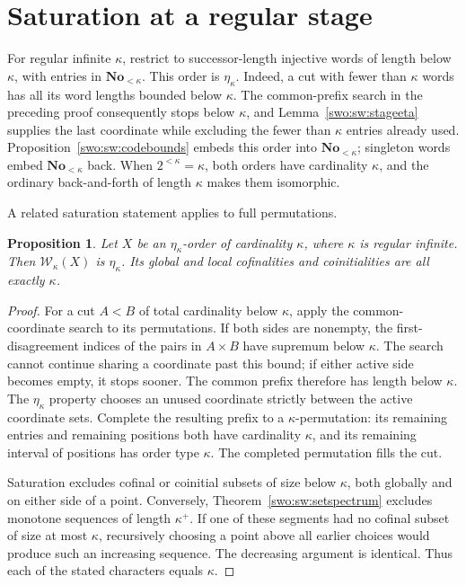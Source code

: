 \documentclass[11pt]{article}
\newtheorem{proposition}[proposition]{Proposition}
\theoremstyle{definition}
\theoremstyle{remark}
\newcommand{\No}{\mathbf{No}}
\newcommand{\WO}{\mathcal W}
\begin{document}
\section{Saturation at a regular stage}\label{swo:sw:stagesaturation}

For regular infinite \(\kappa\), restrict to successor-length
injective words of length below \(\kappa\), with entries in
\(\No_{<\kappa}\).
This order is \(\eta_\kappa\).
Indeed, a cut with fewer than \(\kappa\) words has all its
word lengths bounded below \(\kappa\).
The common-prefix search in the preceding proof consequently
stops below \(\kappa\), and Lemma~\ref{swo:sw:stageeta} supplies
the last coordinate while excluding the fewer than \(\kappa\)
entries already used.
Proposition~\ref{swo:sw:codebounds} embeds this order into \(\No_{<\kappa}\);
singleton words embed \(\No_{<\kappa}\) back.
When \(2^{<\kappa}=\kappa\), both orders have cardinality
\(\kappa\), and the ordinary back-and-forth of length \(\kappa\)
makes them isomorphic.

A related saturation statement applies to full permutations.

\begin{proposition}\label{swo:sw:permutationeta}
Let \(X\) be an \(\eta_\kappa\)-order of cardinality \(\kappa\),
where \(\kappa\) is regular infinite.
Then \(\WO_\kappa(X)\) is \(\eta_\kappa\).
Its global and local cofinalities and coinitialities are
all exactly \(\kappa\).
\end{proposition}

\begin{proof}
For a cut \(A<B\) of total cardinality below \(\kappa\),
apply the common-coordinate search to its permutations.
If both sides are nonempty, the first-disagreement indices
of the pairs in \(A\times B\) have supremum below \(\kappa\).
The search cannot continue sharing a coordinate past this
bound; if either active side becomes empty, it stops sooner.
The common prefix therefore has length below \(\kappa\).
The \(\eta_\kappa\) property chooses an unused coordinate
strictly between the active coordinate sets.
Complete the resulting prefix to a \(\kappa\)-permutation:
its remaining entries and remaining positions both have
cardinality \(\kappa\), and its remaining interval of positions
has order type \(\kappa\).
The completed permutation fills the cut.

Saturation excludes cofinal or coinitial subsets of size below
\(\kappa\), both globally and on either side of a point.
Conversely, Theorem~\ref{swo:sw:setspectrum} excludes monotone
sequences of length \(\kappa^+\).
If one of these segments had no cofinal subset of size at
most \(\kappa\), recursively choosing a point above all earlier
choices would produce such an increasing sequence.
The decreasing argument is identical.
Thus each of the stated characters equals \(\kappa\).
\end{proof}
\end{document}
